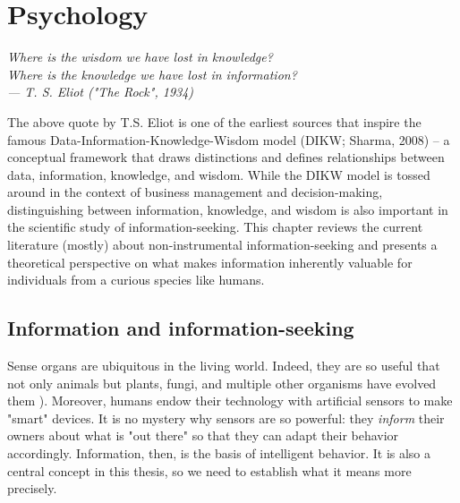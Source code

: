 \chapter{Psychology}\label{ch:psychology}

\begin{flushright}{\slshape
    Where is the wisdom we have lost in knowledge? \\
    Where is the knowledge we have lost in information? \\
    --- T. S. Eliot ("The Rock", 1934)}
\end{flushright}
The above quote by T.S. Eliot is one of the earliest sources that inspire the famous Data-Information-Knowledge-Wisdom model (DIKW; Sharma, 2008) -- a conceptual framework that draws distinctions and defines relationships between data, information, knowledge, and wisdom. While the DIKW model is tossed around in the context of business management and decision-making, distinguishing between information, knowledge, and wisdom is also important in the scientific study of information-seeking. This chapter reviews the current literature (mostly) about non-instrumental information-seeking and presents a theoretical perspective on what makes information inherently valuable for individuals from a curious species like humans.

\section{Information and information-seeking}

Sense organs are ubiquitous in the living world. Indeed, they are so useful that not only animals but plants, fungi, and multiple other organisms have evolved them \cite{trewavas_plant_2005,braunsdorf_fungal_2016,bourret_census_200,schwab_evolution_2018}). Moreover, humans endow their technology with artificial sensors to make "smart" devices. %
It is no mystery why sensors are so powerful: they \emph{inform} their owners about what is "out there" so that they can adapt their behavior accordingly. Information, then, is the basis of intelligent behavior. It is also a central concept in this thesis, so we need to establish what it means more precisely. 


